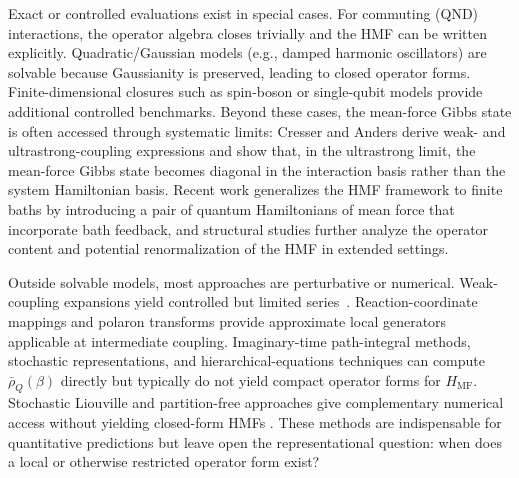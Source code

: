 Exact or controlled evaluations exist in special cases. For commuting (QND)
interactions, the operator algebra closes trivially and the HMF can be written
explicitly\cite{campisiTalknerHanggi2009Solvable}. Quadratic/Gaussian models
(e.g., damped harmonic oscillators) are solvable because Gaussianity is
preserved, leading to closed operator forms\cite{caldeiraQuantumTunnellingDissipative1983a,grabertQuantumBrownianMotion1988,hiltHamiltonianMeanForce2011}.
Finite-dimensional closures such as spin-boson or single-qubit models provide
additional controlled benchmarks\cite{leggettDynamicsDissipativeTwostate1987}.
Beyond these cases, the mean-force Gibbs state is often accessed through
systematic limits: Cresser and Anders derive weak- and ultrastrong-coupling
expressions and show that, in the ultrastrong limit, the mean-force Gibbs state
becomes diagonal in the interaction basis rather than the system Hamiltonian
basis\cite{cresserWeakUltrastrongCoupling2021a,hovhannisyanHamiltonianMeanForce2020}. Recent work generalizes the HMF
framework to finite baths by introducing a pair of quantum Hamiltonians of mean
force that incorporate bath feedback\cite{duGeneralizedHamiltonianMeanforce2025a},
and structural studies further analyze the operator content and potential
renormalization of the HMF in extended settings\cite{burkeStructureHamiltonianMean2024,correaPotentialRenormalisationLamb2025}.

Outside solvable models, most approaches are perturbative or numerical.
Weak-coupling expansions yield controlled but limited series~\cite{cresserWeakUltrastrongCoupling2021a,breuerTheoryOpenQuantum2002}.
Reaction-coordinate mappings\cite{nazirReactionCoordinateMapping2018,IlesSmithDijkstraLambertNazir2016,AntoSztrikacsNazirSegal2023,ShubrookIlesSmithNazir2025}
and polaron transforms provide approximate local generators applicable at intermediate coupling.
Imaginary-time path-integral methods, stochastic representations, and hierarchical-equations techniques can
compute $\bar\rho_Q(\beta)$ directly but typically do not yield compact operator
forms for $H_{\mathrm{MF}}$\cite{moixEquilibriumreducedDensityMatrix2012,chenRigorousStochasticMatrix2014,makriExploitingClassicalDecoherence2014,tanimuraReducedHierarchicalEquations2014,songCalculationCorrelatedInitial2015,XuVadimovStockburgerAnkerhold2026}.
Stochastic Liouville and partition-free approaches give complementary
numerical access without yielding closed-form HMFs
\cite{stockburgerSimulatingSpinbosonDynamics2004,mccaulPartitionfreeApproachOpen2017c}.
These methods are indispensable for quantitative predictions but leave open the
representational question: when does a local or otherwise restricted operator
form exist?

